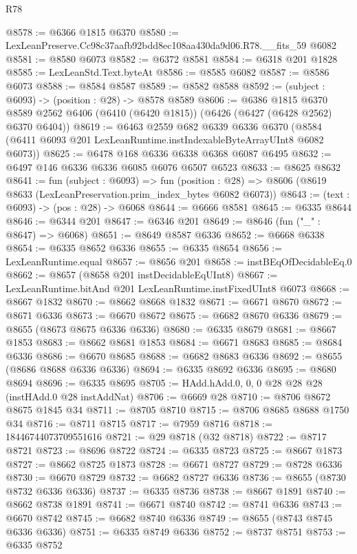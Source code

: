 \begin{lexlean}{R78}
\begin{coremodule}
@8578 := @6366 @1815 @6370
@8580 := LexLeanPreserve.Cc98c37aafb92bdd8ec108aa430da9d06.R78.__fits_59 @6082
@8581 := @8580 @6073
@8582 := @6372 @8581
@8584 := @6318 @201 @1828
@8585 := LexLeanStd.Text.byteAt
@8586 := @8585 @6082
@8587 := @8586 @6073
@8588 := @8584 @8587
@8589 := @8582 @8588
@8592 := (subject : @6093) -> (position : @28) -> @8578 @8589
@8606 := @6386
    @1815
    @6370
    @8589
    @2562
    @6406
    (@6410 (@6420 @1815))
    (@6426 (@6427 (@6428 @2562) @6370 @6404))
@8619 := @6463
    @2559
    @682
    @6339
    @6336
    @6370
    (@8584 (@6411 @6093 @201 LexLeanRuntime.instIndexableByteArrayUInt8 @6082 @6073))
@8625 := @6478 @168 @6336 @6338 @6368 @6087 @6495
@8632 := @6497 @146 @6336 @6336 @6085 @6076 @6507 @6523
@8633 := @8625 @8632
@8641 := fun (subject : @6093) =>
  fun (position : @28) => @8606 (@8619 @8633 (LexLeanPreservation.prim_index_bytes @6082 @6073))
@8643 := (text : @6093) -> (pos : @28) -> @6068
@8644 := @6666 @8581
@8645 := @6335 @8644
@8646 := @6344 @201
@8647 := @6346 @201
@8649 := @8646 (fun ("_" : @8647) => @6068)
@8651 := @8649 @8587 @6336
@8652 := @6668 @6338
@8654 := @6335 @8652 @6336
@8655 := @6335 @8654
@8656 := LexLeanRuntime.equal
@8657 := @8656 @201
@8658 := instBEqOfDecidableEq.{0}
@8662 := @8657 (@8658 @201 instDecidableEqUInt8)
@8667 := LexLeanRuntime.bitAnd @201 LexLeanRuntime.instFixedUInt8 @6073
@8668 := @8667 @1832
@8670 := @8662 @8668 @1832
@8671 := @6671 @8670
@8672 := @8671 @6336
@8673 := @6670 @8672
@8675 := @6682 @8670 @6336
@8679 := @8655 (@8673 @8675 @6336 @6336)
@8680 := @6335 @8679
@8681 := @8667 @1853
@8683 := @8662 @8681 @1853
@8684 := @6671 @8683
@8685 := @8684 @6336
@8686 := @6670 @8685
@8688 := @6682 @8683 @6336
@8692 := @8655 (@8686 @8688 @6336 @6336)
@8694 := @6335 @8692 @6336
@8695 := @8680 @8694
@8696 := @6335 @8695
@8705 := HAdd.hAdd.{0, 0, 0} @28 @28 @28 (instHAdd.{0} @28 instAddNat)
@8706 := @6669 @28
@8710 := @8706 @8672 @8675 @1845 @34
@8711 := @8705 @8710
@8715 := @8706 @8685 @8688 @1750 @34
@8716 := @8711 @8715
@8717 := @7959 @8716
@8718 := 18446744073709551616
@8721 := @29 @8718 (@32 @8718)
@8722 := @8717 @8721
@8723 := @8696 @8722
@8724 := @6335 @8723
@8725 := @8667 @1873
@8727 := @8662 @8725 @1873
@8728 := @6671 @8727
@8729 := @8728 @6336
@8730 := @6670 @8729
@8732 := @6682 @8727 @6336
@8736 := @8655 (@8730 @8732 @6336 @6336)
@8737 := @6335 @8736
@8738 := @8667 @1891
@8740 := @8662 @8738 @1891
@8741 := @6671 @8740
@8742 := @8741 @6336
@8743 := @6670 @8742
@8745 := @6682 @8740 @6336
@8749 := @8655 (@8743 @8745 @6336 @6336)
@8751 := @6335 @8749 @6336
@8752 := @8737 @8751
@8753 := @6335 @8752

\end{coremodule}
\end{lexlean}
